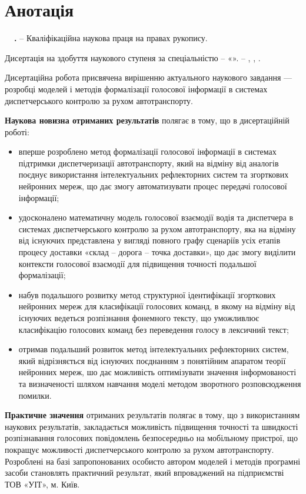 \chapter*{Анотація}

\textbf{\thesisAuthorLastName~\thesisAuthorInitials\ \thesisTitle.} – Кваліфікаційна наукова праця на
правах рукопису.

Дисертація на здобуття наукового ступеня \thesisDegree за
спеціальністю \thesisSpecialtyNumber – «\thesisSpecialtyTitle». – \thesisOrganizationDone, \thesisCity, \thesisYear.

Дисертаційна робота присвячена вирішенню актуального наукового завдання --- розробці моделей і методів формалізації голосової інформації в системах диспетчерського контролю за рухом автотранспорту.

\textbf{Наукова новизна отриманих результатів} полягає в тому, що в дисертаційній роботі:

\begin{itemize}
	\item вперше розроблено метод формалізації голосової інформації в системах підтримки диспетчеризації автотранспорту, який на відміну від аналогів поєднує використання інтелектуальних рефлекторних систем та згорткових нейронних мереж, що дає змогу автоматизувати процес передачі голосової інформації;
	\item удосконалено математичну модель голосової взаємодії водія та диспетчера в системах диспетчерського контролю за рухом автотранспорту, яка на відміну від існуючих представлена у вигляді повного графу сценаріїв усіх етапів процесу доставки «склад – дорога – точка доставки», що дає змогу виділити контексти голосової взаємодії для підвищення точності подальшої формалізації;
	\item набув подальшого розвитку метод структурної ідентифікації згорткових нейронних мереж для класифікації голосових команд, в якому на відміну від існуючих ведеться розпізнання фонемного тексту, що уможливлює класифікацію голосових команд без переведення голосу в лексичний текст;
	\item отримав подальший розвиток метод інтелектуальних рефлекторних систем, який відрізняється від існуючих поєднанням з понятійним апаратом теорії нейронних мереж, шо дає можливість оптимізувати значення інформованості та визначеності шляхом навчання моделі методом зворотного розповсюдження помилки.
\end{itemize}

\textbf{Практичне значення} отриманих результатів полягає в тому, що з використанням наукових результатів, закладається можливість підвищення точності та швидкості розпізнавання голосових повідомлень безпосередньо на мобільному пристрої, що покращує можливості диспетчерського контролю за рухом автотранспорту. Розроблені на базі запропонованих особисто автором моделей і методів програмні засоби становлять практичний результат, який впроваджений на підприємстві ТОВ «УІТ», м. Київ.

